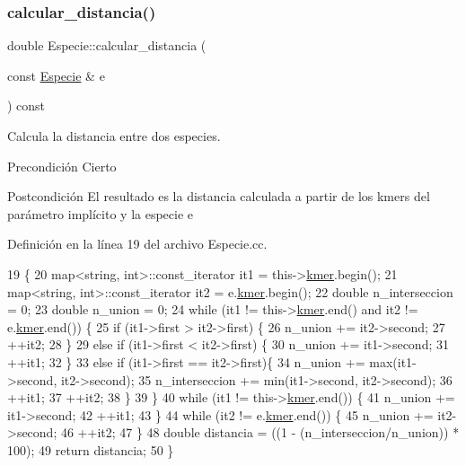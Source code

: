 \subsubsection{\texorpdfstring{calcular\+\_\+distancia()}{calcular\_distancia()}}
{\footnotesize\ttfamily double Especie\+::calcular\+\_\+distancia (\begin{DoxyParamCaption}\item[{const \hyperlink{class_especie}{Especie} \&}]{e }\end{DoxyParamCaption}) const}



Calcula la distancia entre dos especies. 

\begin{DoxyPrecond}{Precondición}
Cierto 
\end{DoxyPrecond}
\begin{DoxyPostcond}{Postcondición}
El resultado es la distancia calculada a partir de los kmers del parámetro implícito y la especie e 
\end{DoxyPostcond}


Definición en la línea 19 del archivo Especie.\+cc.


\begin{DoxyCode}
19                                                          \{
20   map<string, int>::const\_iterator it1 = this->\hyperlink{class_especie_aa438e3e2f785d96c0ac51e83f60a5879}{kmer}.begin();
21   map<string, int>::const\_iterator it2 = e.\hyperlink{class_especie_aa438e3e2f785d96c0ac51e83f60a5879}{kmer}.begin();
22   \textcolor{keywordtype}{double} n\_interseccion = 0;
23   \textcolor{keywordtype}{double} n\_union = 0;
24   \textcolor{keywordflow}{while} (it1 != this->\hyperlink{class_especie_aa438e3e2f785d96c0ac51e83f60a5879}{kmer}.end() and it2 != e.\hyperlink{class_especie_aa438e3e2f785d96c0ac51e83f60a5879}{kmer}.end()) \{
25     \textcolor{keywordflow}{if} (it1->first > it2->first) \{
26       n\_union += it2->second;
27       ++it2;
28     \}
29     \textcolor{keywordflow}{else} \textcolor{keywordflow}{if} (it1->first < it2->first) \{
30       n\_union += it1->second;
31       ++it1;
32     \}
33     \textcolor{keywordflow}{else} \textcolor{keywordflow}{if} (it1->first == it2->first)\{
34       n\_union += max(it1->second, it2->second);
35       n\_interseccion += min(it1->second, it2->second);
36       ++it1;
37       ++it2;
38     \}
39   \}
40   \textcolor{keywordflow}{while} (it1 != this->\hyperlink{class_especie_aa438e3e2f785d96c0ac51e83f60a5879}{kmer}.end()) \{
41     n\_union += it1->second;
42     ++it1;
43   \}
44   \textcolor{keywordflow}{while} (it2 != e.\hyperlink{class_especie_aa438e3e2f785d96c0ac51e83f60a5879}{kmer}.end()) \{
45     n\_union += it2->second;
46     ++it2;
47   \}
48   \textcolor{keywordtype}{double} distancia = ((1 - (n\_interseccion/n\_union)) * 100);
49   \textcolor{keywordflow}{return} distancia;
50 \}
\end{DoxyCode}
\mbox{\label{class_especie_a59b02cb7174198fae20fe23230a527d4}} 
